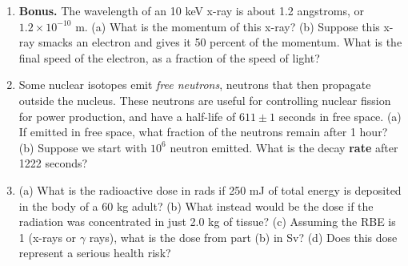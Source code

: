 \documentclass[12pt,twocolumn]{article}
\begin{document}
\begin{enumerate}
\item \textbf{Bonus.}  The wavelength of an 10 keV x-ray is about 1.2 angstroms, or $1.2 \times 10^{-10}$ m.  (a) What is the momentum of this x-ray? (b) Suppose this x-ray smacks an electron and gives it 50 percent of the momentum.  What is the final speed of the electron, as a fraction of the speed of light? \\ \vspace{2cm}
\item Some nuclear isotopes emit \textit{free neutrons}, neutrons that then propagate outside the nucleus.  These neutrons are useful for controlling nuclear fission for power production, and have a half-life of $611\pm 1$ seconds in free space.  (a) If emitted in free space, what fraction of the neutrons remain after 1 hour? (b) Suppose we start with $10^6$ neutron emitted.  What is the decay \textbf{rate} after 1222 seconds? \\ \vspace{3cm}
\item (a) What is the radioactive dose in rads if 250 mJ of total energy is deposited in the body of a 60 kg adult? (b) What instead would be the dose if the radiation was concentrated in just 2.0 kg of tissue? (c) Assuming the RBE is 1 (x-rays or $\gamma$ rays), what is the dose from part (b) in Sv? (d) Does this dose represent a serious health risk? \\ \vspace{2cm}
\end{enumerate}
\end{document}

